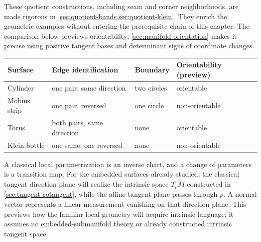 These quotient constructions, including seam and corner neighborhoods,
are made rigorous in \cref{sec:quotient-bands,sec:quotient-klein}.
They enrich the geometric examples without entering the prerequisite chain
of this chapter. The comparison below previews orientability;
\cref{sec:manifold-orientation} makes it precise using positive tangent
bases and determinant signs of coordinate changes.
\begin{center}
\small
\begin{tabular}{l l l l}
Surface & Edge identification & Boundary & Orientability (preview)\\\hline
Cylinder & one pair, same direction & two circles & orientable\\
M\"obius strip & one pair, reversed & one circle & non-orientable\\
Torus & both pairs, same direction & none & orientable\\
Klein bottle & one same, one reversed & none & non-orientable
\end{tabular}
\end{center}

\begin{remark}
A classical local parametrization is an inverse chart, and a change of
parameters is a transition map. For the embedded surfaces already studied,
the classical tangent direction plane will realize the intrinsic space
$T_pM$ constructed in \cref{sec:tangent-cotangent}, while the affine
tangent plane passes through $p$. A normal vector represents a linear
measurement vanishing on that direction plane. This previews how the
familiar local geometry will acquire intrinsic language; it assumes no
embedded-submanifold theory or already constructed intrinsic tangent space.
\end{remark}

